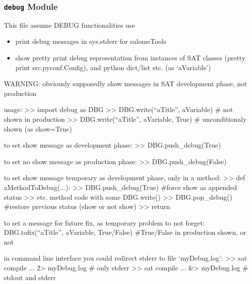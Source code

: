 \documentclass[a4paper,10pt,english]{sphinxmanual}
\begin{document}
\subsubsection{\texttt{debug} Module}
\label{commands/apidoc/src:module-src.debug}\label{commands/apidoc/src:debug-module}
This file assume DEBUG functionalities use
\begin{itemize}
\item {} 
print debug messages in sys.stderr for salomeTools

\item {} 
show pretty print debug representation from instances of SAT classes
(pretty print src.pyconf.Config), and python dict/list etc. (as `aVariable')

\end{itemize}

WARNING: obviously supposedly show messages in SAT development phase, not production

usage:
\textgreater{}\textgreater{} import debug as DBG
\textgreater{}\textgreater{} DBG.write(``aTitle'', aVariable)        \# not shown in production 
\textgreater{}\textgreater{} DBG.write(``aTitle'', aVariable, True)  \# unconditionaly shown (as show=True)

to set show message as development phase:
\textgreater{}\textgreater{} DBG.push\_debug(True)

to set no show message as production phase:
\textgreater{}\textgreater{} DBG.push\_debug(False)

to set show message temporary as development phase, only in a method:
\textgreater{}\textgreater{} def aMethodToDebug(...):
\textgreater{}\textgreater{}   DBG.push\_debug(True)              \#force show as appended status
\textgreater{}\textgreater{}   etc. method code with some DBG.write()
\textgreater{}\textgreater{}   DBG.pop\_debug()                   \#restore previous status (show or not show)
\textgreater{}\textgreater{}   return

to set a message for future fix, as temporary problem to not forget:
DBG.tofix(``aTitle'', aVariable, True/False) \#True/False in production shown, or not

in command line interface you could redirect stderr to file `myDebug.log':
\textgreater{}\textgreater{} sat compile ... 2\textgreater{} myDebug.log   \# only stderr
\textgreater{}\textgreater{} sat compile ... \&\textgreater{} myDebug.log   \# stdout and stderr
\end{document}
